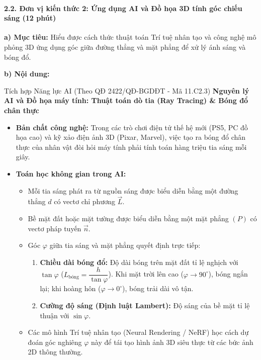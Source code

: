 \documentclass[12pt, a4paper]{article}
\renewcommand{\vec}[1]{\overrightarrow{#1}}
\begin{document}
\paragraph{2.2. Đơn vị kiến thức 2: Ứng dụng AI và Đồ họa 3D tính góc chiếu sáng (12 phút)}

\noindent \textbf{a) Mục tiêu:}
Hiểu được cách thức thuật toán Trí tuệ nhân tạo và công nghệ mô phỏng 3D ứng dụng góc giữa đường thẳng và mặt phẳng để xử lý ánh sáng và bóng đổ.

\noindent \textbf{b) Nội dung:}
\begin{aibox}{Tích hợp Năng lực AI (Theo QĐ 2422/QĐ-BGDĐT - Mã 11.C2.3)}
\textbf{Nguyên lý AI và Đồ họa máy tính: Thuật toán dò tia (Ray Tracing) \& Bóng đổ chân thực}
\begin{itemize}[leftmargin=0.6cm]
    \item \textbf{Bản chất công nghệ:} Trong các trò chơi điện tử thế hệ mới (PS5, PC đồ họa cao) và kỹ xảo điện ảnh 3D (Pixar, Marvel), việc tạo ra bóng đổ chân thực của nhân vật đòi hỏi máy tính phải tính toán hàng triệu tia sáng mỗi giây.
    \item \textbf{Toán học không gian trong AI:}
    \begin{itemize}
        \item Mỗi tia sáng phát ra từ nguồn sáng được biểu diễn bằng một đường thẳng $d$ có vectơ chỉ phương $\vec{L}$.
        \item Bề mặt đất hoặc mặt tường được biểu diễn bằng một mặt phẳng $(P)$ có vectơ pháp tuyến $\vec{n}$.
        \item Góc $\varphi$ giữa tia sáng và mặt phẳng quyết định trực tiếp:
        \begin{enumerate}
            \item \textbf{Chiều dài bóng đổ:} Độ dài bóng trên mặt đất tỉ lệ nghịch với $\tan \varphi$ ($L_{\text{bóng}} = \dfrac{h}{\tan \varphi}$). Khi mặt trời lên cao ($\varphi \to 90^\circ$), bóng ngắn lại; khi hoàng hôn ($\varphi \to 0^\circ$), bóng trải dài vô tận.
            \item \textbf{Cường độ sáng (Định luật Lambert):} Độ sáng của bề mặt tỉ lệ thuận với $\sin \varphi$.
        \end{enumerate}
        \item Các mô hình Trí tuệ nhân tạo (Neural Rendering / NeRF) học cách dự đoán góc nghiêng $\varphi$ này để tái tạo hình ảnh 3D siêu thực từ các bức ảnh 2D thông thường.
    \end{itemize}
\end{itemize}
\end{aibox}
\end{document}
